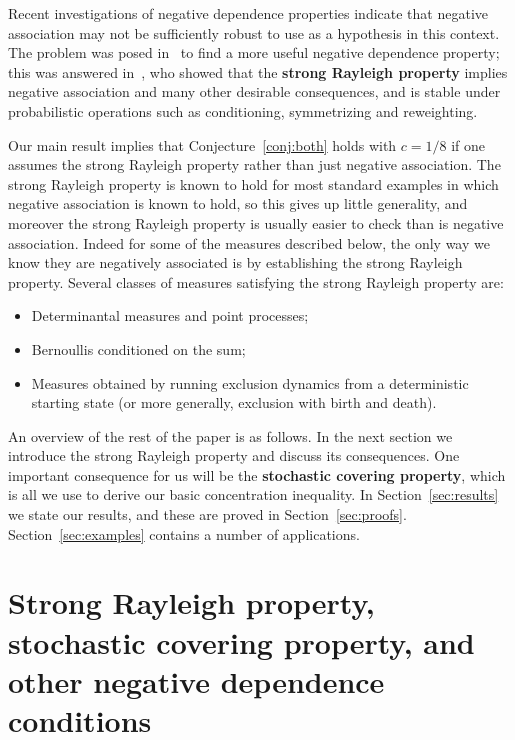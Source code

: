 \documentclass[10pt]{article}
\theoremstyle{plain}
\theoremstyle{remark}
\newcommand{\Em}[1]{\textbf{#1}}
\begin{document}
Recent investigations of negative dependence properties
indicate that negative association may not be sufficiently
robust to use as a hypothesis in this context.  The problem
was posed in~\cite{pemantle-NA} to find a more useful
negative dependence property; this was answered
in~\cite{borcea-branden-liggett}, who showed that the
\Em{strong Rayleigh property} implies negative association
and many other desirable consequences, and is stable under
probabilistic operations such as conditioning, symmetrizing
and reweighting.

Our main result implies that Conjecture~\ref{conj:both} holds
with $c = 1/8$ if one assumes the strong Rayleigh property
rather than just negative association.
The strong Rayleigh property is known to hold for
most standard examples in which negative association is known
to hold, so this gives up little generality, and moreover the
strong Rayleigh property is usually easier to check than is
negative association.  Indeed for some of the measures described
below, the only way we know they are negatively associated is
by establishing the strong Rayleigh property.  Several classes
of measures satisfying the strong Rayleigh property are:
%
\begin{itemize}
\item Determinantal measures and point processes;
\item Bernoullis conditioned on the sum;
\item Measures obtained by running exclusion dynamics from a
deterministic starting state (or more generally, exclusion with
birth and death).
\end{itemize}


An overview of the rest of the paper is as follows.  In the
next section we introduce the strong Rayleigh property
and discuss its consequences.  One important consequence for
us will be the \Em{stochastic covering property}, which is
all we use to derive our basic concentration inequality.
In Section~\ref{sec:results} we state our results, and these
are proved in Section~\ref{sec:proofs}.  Section~\ref{sec:examples}
contains a number of applications.

\section{Strong Rayleigh property, stochastic covering property,
and other negative dependence conditions}
\label{sec:covering}
\end{document}
